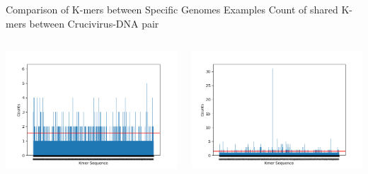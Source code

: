 \documentclass{beamer}
\begin{document}
\begin{frame}{Comparison of K-mers between Specific Genomes Examples}
    \centering
    Count of shared K-mers between Crucivirus-DNA pair
    \begin{columns}
        \begin{column}{0.5\textwidth}
            \centering
            \includegraphics[scale = 0.5]{ComparisonBetweenCruci296DNAMH617605.png}
        \end{column}
        \begin{column}{0.5\textwidth}
            \centering
            \includegraphics[scale = 0.5]{ComparisonBetweenCruci88DNAKT04807.png}
        \end{column}
    \end{columns}
\end{frame}

\backmatter
\end{document}
